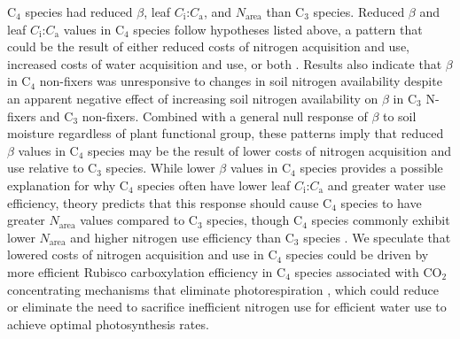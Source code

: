 C$_4$ species had reduced $\beta$, leaf $C_\mathrm{i}$:$C_\mathrm{a}$, and $N_\mathrm{area}$ than C$_3$ species. Reduced $\beta$ and leaf $C_\mathrm{i}$:$C_\mathrm{a}$ values in C$_4$ species follow hypotheses listed above, a pattern that could be the result of either reduced costs of nitrogen acquisition and use, increased costs of water acquisition and use, or both . Results also indicate that $\beta$ in C$_4$ non-fixers was unresponsive to changes in soil nitrogen availability despite an apparent negative effect of increasing soil nitrogen availability on $\beta$ in C$_3$ N-fixers and C$_3$ non-fixers. Combined with a general null response of $\beta$ to soil moisture regardless of plant functional group, these patterns imply that reduced $\beta$ values in C$_4$ species may be the result of lower costs of nitrogen acquisition and use relative to C$_3$ species. While lower $\beta$ values in C$_4$ species provides a possible explanation for why C$_4$ species often have lower leaf $C_\mathrm{i}$:$C_\mathrm{a}$ and greater water use efficiency, theory predicts that this response should cause C$_4$ species to have greater $N_\mathrm{area}$ values compared to C$_3$ species, though C$_4$ species commonly exhibit lower $N_\mathrm{area}$ and higher nitrogen use efficiency than C$_3$ species . We speculate that lowered costs of nitrogen acquisition and use in C$_4$ species could be driven by more efficient Rubisco carboxylation efficiency in C$_4$ species associated with CO$_2$ concentrating mechanisms that eliminate photorespiration , which could reduce or eliminate the need to sacrifice inefficient nitrogen use for efficient water use to achieve optimal photosynthesis rates.

